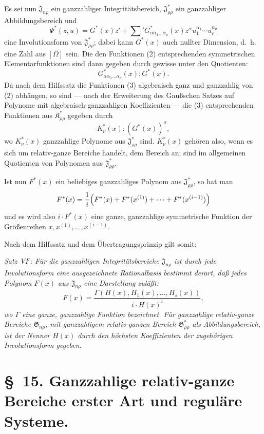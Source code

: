 \documentclass[11pt]{article}
\providecommand{\Kfield}{\mathfrak{K}}
\providecommand{\Jdom}{\mathfrak{J}}
\providecommand{\Gdom}{\mathfrak{G}}
\begin{document}
Es sei nun $\Jdom_{n\rho}$ ein ganzzahliger Integritätsbereich, $\Jdom^*_{\rho\rho}$ ein ganzzahliger Abbildungsbereich und
\[
  \Psi^*(z,u)=G^*(x)z^i+
  \sum{}'G^*_{\alpha\alpha_1\ldots\alpha_\rho}(x)
  z^\alpha u_1^{\alpha_1}\cdots u_\rho^{\alpha_\rho}
\]
eine Involutionsform von $\Jdom^*_{\rho\rho}$; dabei kann $G^*(x)$ auch nullter Dimension, d.~h. eine Zahl aus $[\Omega]$ sein. Die den Funktionen (2) entsprechenden symmetrischen Elementarfunktionen sind dann gegeben durch gewisse unter den Quotienten:
\begin{equation}
  G^*_{\alpha\alpha_1\ldots\alpha_\rho}(x):G^*(x).
\tag{4}
\end{equation}
Da nach dem Hilfssatz die Funktionen (3) algebraisch ganz und ganzzahlig von (2) abhängen, so sind --- nach der Erweiterung des Gaußschen Satzes auf Polynome mit algebraisch-ganzzahligen Koeffizienten --- die (3) entsprechenden Funktionen aus $\Kfield^*_{\rho\rho}$ gegeben durch
\begin{equation}
  K_\nu^*(x):(G^*(x))^\sigma,
\tag{5}
\end{equation}
wo $K_\nu^*(x)$ ganzzahlige Polynome aus $\Jdom^*_{\rho\rho}$ sind. $K_\nu^*(x)$ gehören also, wenn es sich um relativ-ganze Bereiche handelt, dem Bereich an; sind im allgemeinen Quotienten von Polynomen aus $\Jdom^*_{\rho\rho}$.

Ist nun $F^*(x)$ ein beliebiges ganzzahliges Polynom aus $\Jdom^*_{\rho\rho}$, so hat man
\[
  F^*(x)=\frac1i\Bigl(F^*(x)+F^*(x^{(1)})+\cdots+F^*(x^{(i-1)})\Bigr)
\]
und es wird also $i\cdot F^*(x)$ eine ganze, ganzzahlige symmetrische Funktion der Größenreihen $x,x^{(1)},\ldots,x^{(i-1)}$.

Nach dem Hilfssatz und dem Übertragungsprinzip gilt somit:

\emph{Satz VI$'$: Für die ganzzahligen Integritätsbereiche $\Jdom_{n\rho}$ ist durch jede Involutionsform eine ausgezeichnete Rationalbasis bestimmt derart, daß jedes Polynom $F(x)$ aus $\Jdom_{n\rho}$ eine Darstellung zuläßt:}
\[
  F(x)=\frac{\Gamma(H(x),H_1(x),\ldots,H_s(x))}{i\cdot H(x)^i},
\]
\emph{wo $\Gamma$ eine ganze, ganzzahlige Funktion bezeichnet. Für ganzzahlige relativ-ganze Bereiche $\Gdom_{n\rho}$, mit ganzzahligem relativ-ganzen Bereich $\Gdom^*_{\rho\rho}$ als Abbildungsbereich, ist der Nenner $H(x)$ durch den höchsten Koeffizienten der zugehörigen Involutionsform gegeben.}

\section*{\S\ 15. Ganzzahlige relativ-ganze Bereiche erster Art und reguläre Systeme.}
\end{document}
